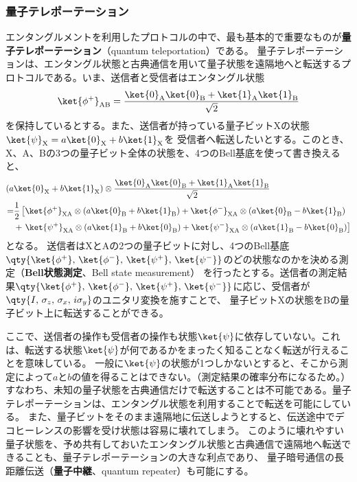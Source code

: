 \documentclass[a4paper,11pt,uplatex]{jsarticle}%
\begin{document}
\newpage

\subsubsection{量子テレポーテーション}
エンタングルメントを利用したプロトコルの中で、最も基本的で重要なものが\textbf{量子テレポーテーション}（quantum teleportation）である。
量子テレポーテーションは、エンタングル状態と古典通信を用いて量子状態を遠隔地へと転送するプロトコルである。いま、送信者と受信者はエンタングル状態
\begin{equation}
  \ket{\phi^{+}}_{\text{AB}} = \frac{\ket{0}_{\text{A}}\ket{0}_{\text{B}} + \ket{1}_{\text{A}}\ket{1}_{\text{B}}}{\sqrt{2}}
\end{equation}
を保持しているとする。また、送信者が持っている量子ビットXの状態$\ket{\psi}_{\text{X}} = a\ket{0}_{\text{X}} + b\ket{1}_{\text{X}}$を
受信者へ転送したいとする。このとき、X、A、Bの3つの量子ビット全体の状態を、4つのBell基底を使って書き換えると、
\begin{align}
  (a&\ket{0}_{\text{X}}+b\ket{1}_{\text{X}})\otimes  \frac{\ket{0}_{\text{A}}\ket{0}_{\text{B}} + \ket{1}_{\text{A}}\ket{1}_{\text{B}}}{\sqrt{2}} \notag\\
  =& \frac{1}{2}\left[\ket{\phi^{+}}_{\text{XA}}\otimes(a\ket{0}_{\text{B}}+b\ket{1}_{\text{B}}) + \ket{\phi^{-}}_{\text{XA}}\otimes(a\ket{0}_{\text{B}}-b\ket{1}_{\text{B}})\right.\notag\\
  &+\left.\ket{\psi^{+}}_{\text{XA}}\otimes(a\ket{1}_{\text{B}}+b\ket{0}_{\text{B}}) + \ket{\psi^{-}}_{\text{XA}}\otimes(a\ket{1}_{\text{B}}-b\ket{0}_{\text{B}})\right]
\end{align}
となる。
送信者はXとAの2つの量子ビットに対し、4つのBell基底$\qty{\ket{\phi^+},\,\ket{\phi^{-}},\,\ket{\psi^{+}},\,\ket{\psi^{-}}}$のどの状態なのかを決める測定（\textbf{Bell状態測定}、Bell state measurement）
を行ったとする。送信者の測定結果$\qty{\ket{\phi^+},\,\ket{\phi^{-}},\,\ket{\psi^{+}},\,\ket{\psi^{-}}}$に応じ、受信者が$\qty{I,\,\sigma_z,\,\sigma_x,\,i\sigma_y}$のユニタリ変換を施すことで、
量子ビットXの状態をBの量子ビット上に転送することができる。

ここで、送信者の操作も受信者の操作も状態$\ket{\psi}$に依存していない。これは、転送する状態$\ket{\psi}$が何であるかをまったく知ることなく転送が行えることを意味している。
一般に$\ket{\psi}$の状態が1つしかないとすると、そこから測定によって$a$と$b$の値を得ることはできない。（測定結果の確率分布になるため。）
すなわち、未知の量子状態を古典通信だけで転送することは不可能である。量子テレポーテーションは、エンタングル状態を利用することで転送を可能にしている。
また、量子ビットをそのまま遠隔地に伝送しようとすると、伝送途中でデコヒーレンスの影響を受け状態は容易に壊れてしまう。
このように壊れやすい量子状態を、予め共有しておいたエンタングル状態と古典通信で遠隔地へ転送できることも、量子テレポーテーションの大きな利点であり、
量子暗号通信の長距離伝送（\textbf{量子中継}、quantum repeater）も可能にする。
\end{document}
